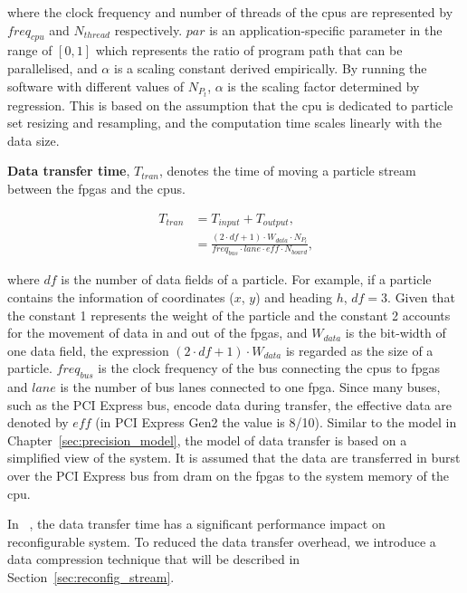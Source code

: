 where the clock frequency and number of threads of the \glspl{cpu} are represented by $freq_{cpu}$ and $N_{thread}$ respectively.
$par$ is an application-specific parameter in the range of $[0,1]$ which represents the ratio of program path that can be parallelised, and $\alpha$ is a scaling constant derived empirically.
By running the software with different values of $N_{P_t}$, $\alpha$ is the scaling factor determined by regression.
This is based on the assumption that the \gls{cpu} is dedicated to particle set resizing and resampling, and the computation time scales linearly with the data size.

\textbf{Data transfer time}, $T_{tran}$, denotes the time of moving a particle stream between the \glspl{fpga} and the \glspl{cpu}.

\begin{equation}
\begin{aligned}
T_{tran} 	&= T_{input} + T_{output} \mbox{,} \\
					&= \frac{(2 \cdot df + 1) \cdot W_{data} \cdot {N_{P_t}}}{\mathit{freq}_{bus} \cdot \mathit{lane} \cdot \mathit{eff} \cdot N_{board}} \mbox{,}
\end{aligned}
\label{eqt:data}
\end{equation}

where $df$ is the number of data fields of a particle.
For example, if a particle contains the information of coordinates ($x$, $y$) and heading $h$, $df=3$.
Given that the constant 1 represents the weight of the particle and the constant 2 accounts for the movement of data in and out of the \glspl{fpga},
and $W_{data}$ is the bit-width of one data field, the expression $(2 \cdot df + 1) \cdot W_{data}$ is regarded as the size of a particle.
$\mathit{freq}_{bus}$ is the clock frequency of the bus connecting the \glspl{cpu} to \glspl{fpga} and $\mathit{lane}$ is the number of bus lanes connected to one \gls{fpga}.
Since many buses, such as the PCI Express bus, encode data during transfer, the effective data are denoted by $\mathit{eff}$ (in PCI Express Gen2 the value is 8/10).
Similar to the model in Chapter~\ref{sec:precision_model}, the model of data transfer is based on a simplified view of the system.
It is assumed that the data are transferred in burst over the PCI Express bus from \gls{dram} on the \glspl{fpga} to the system memory of the \gls{cpu}.

In ~\cite{chau13arc}, the data transfer time has a significant performance impact on reconfigurable system.
To reduced the data transfer overhead, we introduce a data compression technique that will be described in Section~\ref{sec:reconfig_stream}.

